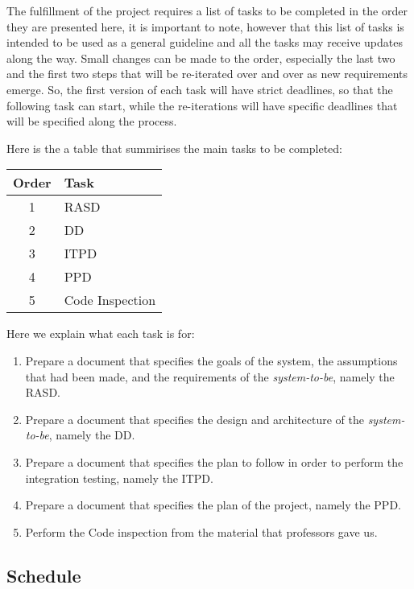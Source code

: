The fulfillment of the project requires a list of tasks to be completed in the order they are presented here, it is important to note, however that this list of tasks is intended to be used as a general guideline and all the tasks may receive updates along the way.
Small changes can be made to the order, especially the last two and the first two steps that will be re-iterated over and over as new requirements emerge.
So, the first version of each task will have strict deadlines, so that the following task can start, while the re-iterations will have specific deadlines that will be specified along the process.

Here is the a table that summirises the main tasks to be completed:
\begin{center}
\begin{tabular}{ |c|l| } \hline
	\textbf{Order} & \textbf{Task} \\ \hline
	1 & RASD \\ \hline
	2 & DD \\ \hline
	3 & ITPD \\ \hline
	4 & PPD \\ \hline
	5 & Code Inspection \\ \hline
\end{tabular}
\end{center}

Here we explain what each task is for:

\begin{enumerate}
	\item Prepare a document that specifies the goals of the system, the assumptions that had been made, and the requirements of the \emph{system-to-be}, namely the RASD.
	\item Prepare a document that specifies the design and architecture of the \emph{system-to-be}, namely the DD.
	\item Prepare a document that specifies the plan to follow in order to perform the integration testing, namely the ITPD.
	\item Prepare a document that specifies the plan of the project, namely the PPD.
	\item Perform the Code inspection from the material that professors gave us.
\end{enumerate}

\subsection{Schedule} %
\label{sub:schedule}

